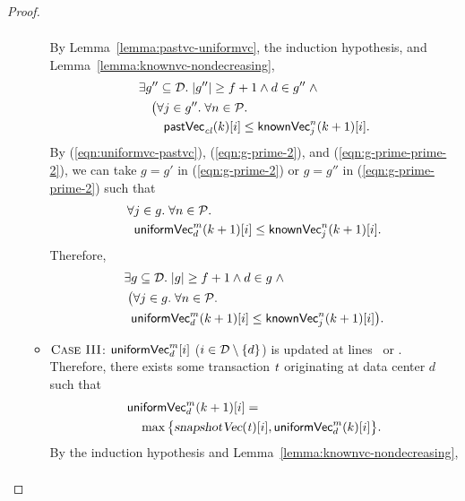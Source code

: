 \begin{proof}
\begin{itemize}
\begin{itemize}
\begin{align}
          \end{align}
          By Lemma~\ref{lemma:pastvc-uniformvc}, the induction hypothesis,
          and Lemma~\ref{lemma:knownvc-nondecreasing},
          \begin{align}
            &\exists g'' \subseteq \mathcal{D}.\; |g''| \ge f + 1 \land d \in g''\; \land
              \label{eqn:g-prime-prime-2} \\
              &\quad \big(\forall j \in g''.\; \forall n \in \mathcal{P}. \nonumber \\
                &\qquad {\sf pastVec}_{\mathit{cl}}(k)[i] \le {\sf knownVec}^{n}_{j}(k+1)[i]. \nonumber
          \end{align}
          By (\ref{eqn:uniformvc-pastvc}), (\ref{eqn:g-prime-2}),
          and (\ref{eqn:g-prime-prime-2}),
          we can take $g = g'$ in (\ref{eqn:g-prime-2})
          or $g = g''$ in (\ref{eqn:g-prime-prime-2}) such that
          \begin{align*}
            &\forall j \in g.\; \forall n \in \mathcal{P}.\; \\
              &\;\; {\sf uniformVec}^{m}_{d}(k+1)[i] \le {\sf knownVec}^{n}_{j}(k+1)[i].
          \end{align*}
          Therefore,
          \begin{align*}
            &\exists g \subseteq \mathcal{D}.\; |g| \ge f + 1 \land d \in g\; \land \\
              &\; \big(\forall j \in g.\; \forall n \in \mathcal{P}.\; \\
                &\;\; {\sf uniformVec}^{m}_{d}(k+1)[i] \le {\sf knownVec}^{n}_{j}(k+1)[i] \big).
          \end{align*}
        \item $\textsc{Case III}$: ${\sf uniformVec}^{m}_{d}[i]$
          ($i \in \mathcal{D} \setminus \{d\}$) is updated
          at lines~\code{\ref{alg:unistore-replica}}{\ref{line:readkey-uniformvc}}
          or \code{\ref{alg:unistore-replica}}{\ref{line:preparecausal-uniformvc}}.
          Therefore, there exists some transaction $\mathit{t}$
          originating at data center $d$ such that
          \begin{align}
            &{\sf uniformVec}^{m}_{d}(k+1)[i] = \label{eqn:uniformvc-snapshotvc} \\
              &\quad \max\big\{\textsl{snapshotVec}(\mathit{t})[i], {\sf uniformVec}^{m}_{d}(k)[i]\big\}.
              \nonumber
          \end{align}
          By the induction hypothesis and Lemma~\ref{lemma:knownvc-nondecreasing},
          \begin{align}

\end{align}
\end{itemize}
\end{itemize}
\end{proof}
